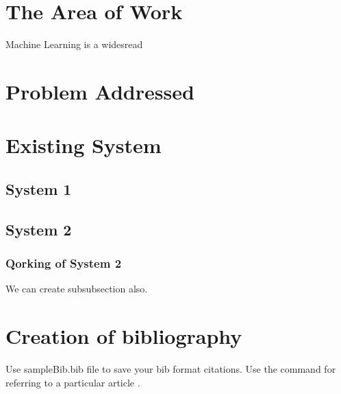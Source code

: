 \section{The Area of Work}
Machine Learning is a widesread
 


\section{Problem Addressed}
\blindtext

\section{Existing System}
\blindtext

\subsection{ System 1}
\blindtext

 \subsection{System 2}
 \subsubsection{Qorking of System 2}
 We can create subsubsection also. 
\section{Creation of bibliography}
Use sampleBib.bib file to save your bib format citations. Use the command \cite{saini2010alternative} for referring to a particular article \cite{imre2006majority}. 





